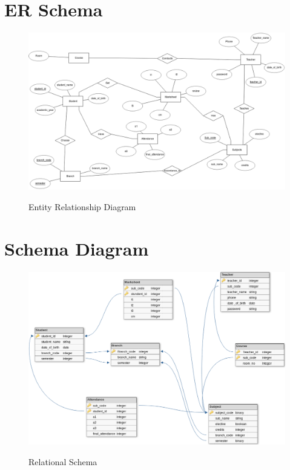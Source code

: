 \section{ER Schema}
\begin{figure}[H]
\centering
\caption{Entity Relationship Diagram}
\includegraphics[width=\textwidth,height=\textheight,keepaspectratio]{./erd.png}
\\[0.2in]
\end{figure}

\pagebreak


\section{Schema Diagram}
\begin{figure}[H]
\centering
\caption{Relational Schema}
\includegraphics[scale=.5]{./schema.png}
\\[0.2in]
\end{figure}

